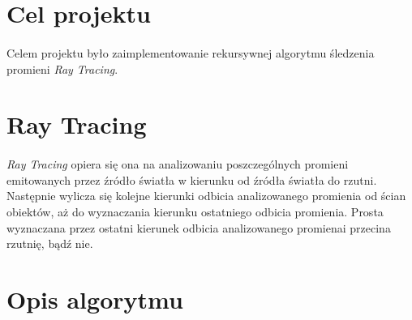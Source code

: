 \documentclass[wide,a4paper,titlepage,12pt] {article}
\begin{document}

\section{Cel projektu}
\paragraph{}
Celem projektu było zaimplementowanie rekursywnej algorytmu śledzenia promieni \textit{Ray Tracing}. 

\section{Ray Tracing}
\paragraph{}
\textit{Ray Tracing} opiera się ona na analizowaniu poszczególnych promieni emitowanych przez źródło światła w kierunku od źródła światła do rzutni. Następnie wylicza się kolejne kierunki odbicia analizowanego promienia od ścian obiektów, aż do wyznaczania kierunku ostatniego odbicia promienia. Prosta wyznaczana przez ostatni kierunek odbicia analizowanego promienai przecina rzutnię, bądź nie.

\section{Opis algorytmu}
\paragraph{}
 
\end{document}

